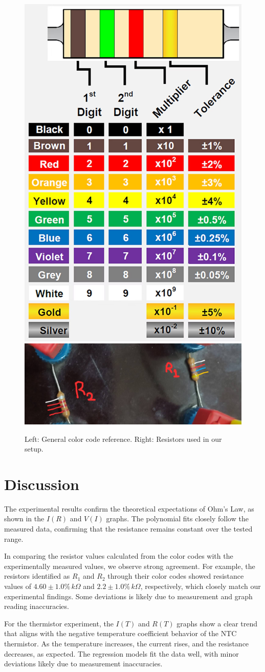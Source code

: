\documentclass[journal]{IEEEtran}
\begin{document}
\begin{figure}[H]
    \centering
    \includegraphics[width=0.45\linewidth]{IMAGES/ColorCode.png}
    \includegraphics[width=0.45\linewidth]{IMAGES/Used_Resistors.jpg}
    \caption{Left: General color code reference. Right: Resistors used in our setup.}
\end{figure}

\section{Discussion}
The experimental results confirm the theoretical expectations of Ohm's Law, as shown in the $I(R)$ and $V(I)$ graphs. The polynomial fits closely follow the measured data, confirming that the resistance remains constant over the tested range.

In comparing the resistor values calculated from the color codes with the experimentally measured values, we observe strong agreement. For example, the resistors identified as $R_1$ and $R_2$ through their color codes showed resistance values of $4.60 \pm 1.0\% \, k\Omega$ and $2.2 \pm 1.0\% \, k\Omega$, respectively, which closely match our experimental findings. Some deviations is likely due to measurement and graph reading inaccuracies.

For the thermistor experiment, the $I(T)$ and $R(T)$ graphs show a clear trend that aligns with the negative temperature coefficient behavior of the NTC thermistor. As the temperature increases, the current rises, and the resistance decreases, as expected. The regression models fit the data well, with minor deviations likely due to measurement inaccuracies.
\end{document}
